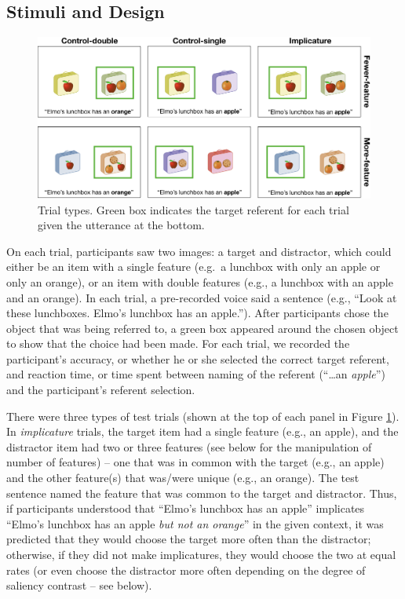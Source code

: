 \documentclass[man]{apa6}
\begin{document}
\subsection{Stimuli and Design}\label{stimuli-and-design}

\begin{figure}
\includegraphics[width=5.98in]{figs/stimuli} \caption{Trial types. Green box indicates the target referent for each trial given the utterance at the bottom.}\label{fig:stimuli}
\end{figure}

On each trial, participants saw two images: a target and distractor,
which could either be an item with a single feature (e.g.~a lunchbox
with only an apple or only an orange), or an item with double features
(e.g., a lunchbox with an apple and an orange). In each trial, a
pre-recorded voice said a sentence (e.g., \enquote{Look at these
lunchboxes. Elmo's lunchbox has an apple.}). After participants chose
the object that was being referred to, a green box appeared around the
chosen object to show that the choice had been made. For each trial, we
recorded the participant's accuracy, or whether he or she selected the
correct target referent, and reaction time, or time spent between naming
of the referent (\enquote{\ldots{}an \emph{apple}}) and the
participant's referent selection.

There were three types of test trials (shown at the top of each panel in
Figure \ref{fig:stimuli}). In \emph{implicature} trials, the target item
had a single feature (e.g., an apple), and the distractor item had two
or three features (see below for the manipulation of number of features)
-- one that was in common with the target (e.g., an apple) and the other
feature(s) that was/were unique (e.g., an orange). The test sentence
named the feature that was common to the target and distractor. Thus, if
participants understood that \enquote{Elmo's lunchbox has an apple}
implicates \enquote{Elmo's lunchbox has an apple \emph{but not an
orange}} in the given context, it was predicted that they would choose
the target more often than the distractor; otherwise, if they did not
make implicatures, they would choose the two at equal rates (or even
choose the distractor more often depending on the degree of saliency
contrast -- see below).
\end{document}
